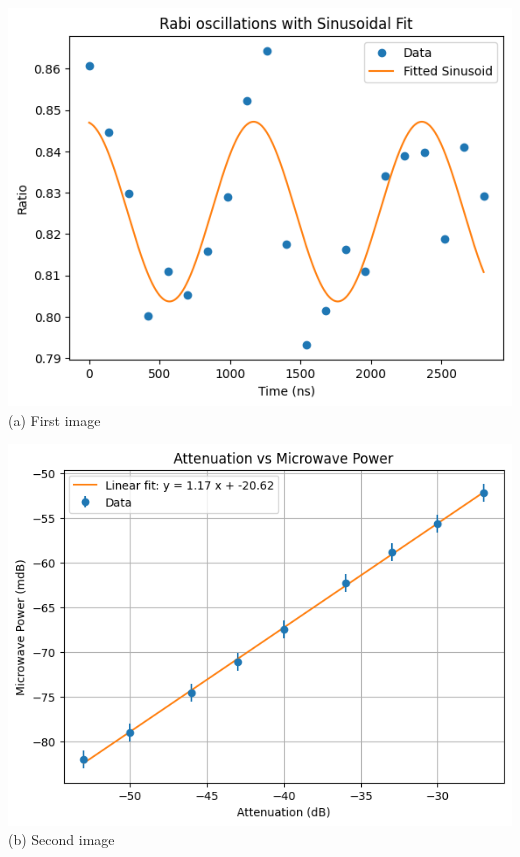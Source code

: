 \begin{frame}{}
    \centering
    \begin{minipage}{0.4\textwidth}
        \centering
        \includegraphics[width=\linewidth]{presentation/figs/oscilations.png} \\
        {\small (a) First image}
    \end{minipage}
    \hfill
    \begin{minipage}{0.4\textwidth}
        \centering
        \includegraphics[width=\linewidth]{presentation/figs/attenuation_vs_power.png} \\
        {\small (b) Second image}
    \end{minipage}


\end{frame}
